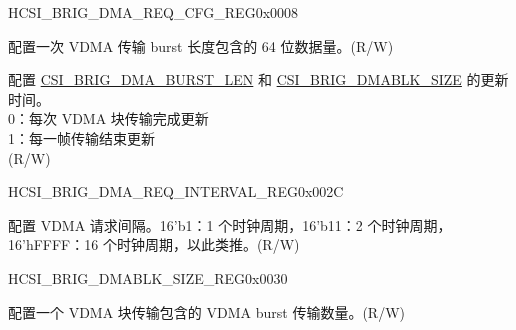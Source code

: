 \begin{register}{H}{CSI\_BRIG\_DMA\_REQ\_CFG\_REG}{0x0008}\label{regdesc:CSIBRIGDMAREQCFGREG}
%
%
%
\regnewline%
\begin{regdesc}\begin{reglist}
\label{fielddesc:CSIBRIGDMABURSTLEN}\item [CSI\_BRIG\_DMA\_BURST\_LEN] 配置一次 VDMA 传输 burst 长度包含的 64 位数据量。(R/W)
\label{fielddesc:CSIBRIGDMACFGUPDBYBLK}\item [CSI\_BRIG\_DMA\_CFG\_UPD\_BY\_BLK] 配置 \hyperref[fielddesc:CSIBRIGDMABURSTLEN]{CSI\_BRIG\_DMA\_BURST\_LEN} 和 \hyperref[fielddesc:CSIBRIGDMABLKSIZE]{CSI\_BRIG\_DMABLK\_SIZE} 的更新时间。\\0：每次 VDMA 块传输完成更新\\1：每一帧传输结束更新\\(R/W)
\end{reglist}\end{regdesc}
\end{register}


\begin{register}{H}{CSI\_BRIG\_DMA\_REQ\_INTERVAL\_REG}{0x002C}\label{regdesc:CSIBRIGDMAREQINTERVALREG}
%
%
\regnewline%
\begin{regdesc}\begin{reglist}
\label{fielddesc:CSIBRIGDMAREQINTERVAL}\item [CSI\_BRIG\_DMA\_REQ\_INTERVAL] 配置 VDMA 请求间隔。16'b1：1 个时钟周期，16'b11：2 个时钟周期，16'hFFFF：16 个时钟周期，以此类推。(R/W)
\end{reglist}\end{regdesc}
\end{register}


\begin{register}{H}{CSI\_BRIG\_DMABLK\_SIZE\_REG}{0x0030}\label{regdesc:CSIBRIGDMABLKSIZEREG}
%
%
\regnewline%
\begin{regdesc}\begin{reglist}
\label{fielddesc:CSIBRIGDMABLKSIZE}\item [CSI\_BRIG\_DMABLK\_SIZE] 配置一个 VDMA 块传输包含的 VDMA burst 传输数量。(R/W)
\end{reglist}\end{regdesc}
\end{register}



